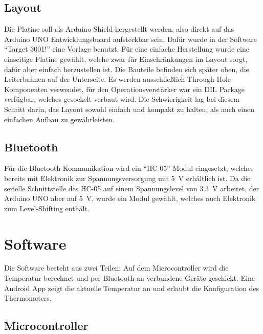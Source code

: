 \documentclass{article}
\begin{document}
  \subsection{Layout}
    Die Platine soll als Arduino-Shield hergestellt werden, also direkt auf das Arduino
    UNO Entwicklungsboard aufsteckbar sein. Dafür wurde in der Software \enquote{Target 3001!}
    eine Vorlage\cite{arduinoTarget} benutzt. Für eine einfache Herstellung wurde
    eine einseitige Platine gewählt, welche zwar für Einschränkungen im Layout
    sorgt, dafür aber einfach herzustellen ist. Die Bauteile befinden sich später
    oben, die Leiterbahnen auf der Unterseite. Es werden ausschließlich
    Through-Hole Komponenten verwendet, für den Operationsverstärker war ein DIL
    Package verfügbar, welches gesockelt verbaut wird. Die Schwierigkeit lag bei
    diesem Schritt darin, das Layout sowohl einfach und kompakt zu halten, als auch
    einen einfachen Aufbau zu gewährleisten.

  \subsection{Bluetooth}
    Für die Bluetooth Kommunikation wird ein \enquote{HC-05} Modul eingesetzt,
    welches bereits mit Elektronik zur Spannungsversorgung mit \SI{5}{\volt}
    erhältlich ist. Da die serielle Schnittstelle des HC-05 auf einem Spannungslevel
    von \SI{3.3}{\volt} arbeitet, der Arduino UNO aber auf \SI{5}{\volt}, wurde
    ein Modul gewählt, welches auch Elektronik zum Level-Shifting enthält.

\section{Software}
  Die Software besteht aus zwei Teilen: Auf dem Microcontroller wird die
  Temperatur berechnet und per Bluetooth an verbundene Geräte geschickt. Eine
  Android App zeigt die aktuelle Temperatur an und erlaubt die Konfiguration des
  Thermometers.

  \subsection{Microcontroller}
\end{document}
